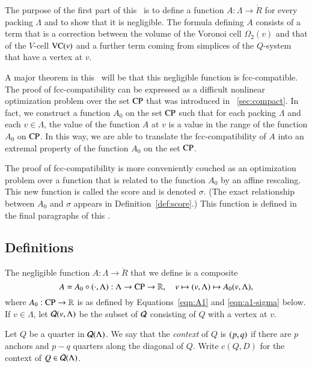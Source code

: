The purpose of the first part of this \chap\ is to define a
function $A:\Lambda\to\ring{R}$ for every 
packing
$\Lambda$ and to show that it is negligible.  The formula defining
$A$ consists of a term that is a correction between the volume of
the Voronoi cell $\Omega_2(v)$ and that of the $V$-cell ${\operatorname{VC}}(v)$
and a further term coming from simplices of the $Q$-system that
have a vertex at $v$.

A major theorem in this \paper\ will be that this negligible
function is fcc-compatible.  The proof of fcc-compatibility can be
expressed as a difficult nonlinear optimization problem over the
set ${\operatorname{CP}}$ that was introduced in \Chap~\ref{sec:compact}.  In
fact, we construct a  function $A_0$ on the set ${\operatorname{CP}}$ such
that for each %
packing $\Lambda$ and each $v\in\Lambda$,
the value of the function $A$ at $v$ is a value in the range of
the function $A_0$ on ${\operatorname{CP}}$. In this way, we are able to
translate the fcc-compatibility of $A$ into an extremal property
of the function $A_0$ on the set ${\operatorname{CP}}$.

The proof of fcc-compatibility is more conveniently couched as an
optimization problem over a function that is related to the
function $A_0$ by an affine rescaling.   This new function is
called the score and is denoted $\sigma$.  (The exact relationship
between $A_0$ and $\sigma$ appears in Definition~\ref{def:score}.)
This function is defined in the final paragraphs of this \chap.


\subsection{Definitions}
\label{sec:rules}


The
negligible function $A:\Lambda\to\ring{R}$ that we define is a
composite
  \begin{equation}
  A = A_0\circ (\cdot,\Lambda)
  :\Lambda\to {\operatorname{CP}}\to \mathbb{R},\quad v\mapsto (v,\Lambda)\mapsto
  A_0(v,\Lambda),
  \label{eqn:A}
  \end{equation}
where $A_0:{\operatorname{CP}}\to\mathbb{R}$ is as defined by
Equations~\ref{eqn:A1} and \ref{eqn:a1-sigma} below.  
If $v\in\Lambda$, let
${\mathcal Q}(v,\Lambda)$ be the subset of ${\mathcal Q}$ consisting of
$Q$ with a vertex at $v$.

\begin{definition} \label{def:context}
Let $Q$ be a quarter in ${\mathcal Q}(\Lambda)$.  We say that the {\it
context\/} of $Q$ is $\relax(p,q)$ if there are $p$ anchors and $p-q$
quarters along the diagonal of $Q$. Write $c(Q,D)$ for the context
of $Q\in{\mathcal Q}(\Lambda)$.
\end{definition}

